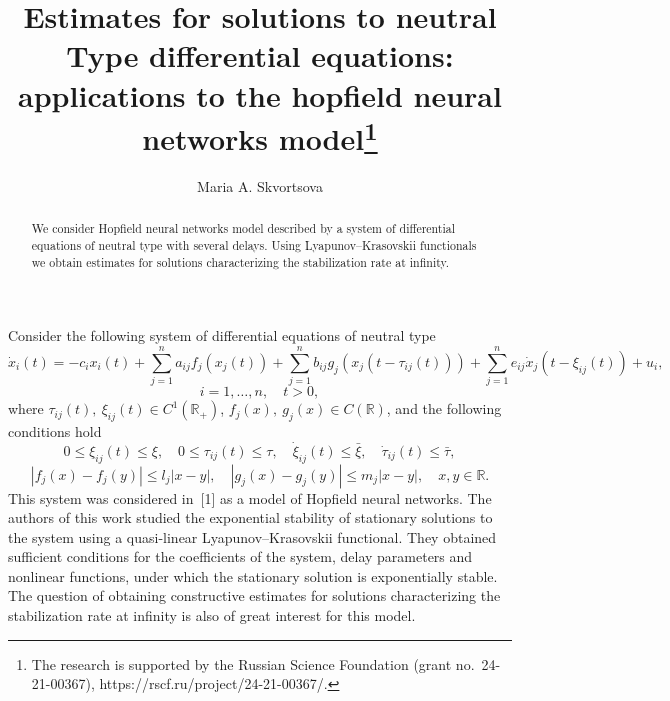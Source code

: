 \documentclass[12pt]{llncs}
\begin{document}
\fi

\title{Estimates for solutions to neutral Type differential equations: applications to the hopfield neural networks model\thanks{The research is supported
by the Russian Science Foundation (grant no.~24-21-00367),
https://rscf.ru/project/24-21-00367/.}}

\author{Maria A. Skvortsova}

\maketitle

\begin{abstract}
We consider Hopfield neural networks model described by a system of differential equations of neutral type with several delays.
Using Lyapunov--Krasovskii functionals we obtain estimates for solutions
characterizing the stabilization rate at infinity.

\end{abstract}

Consider the following system of differential equations of neutral type
$$
\dot{x}_i(t)=-c_i x_i(t)
+\sum\limits_{j=1}^{n} a_{ij} f_j(x_j(t))
+\sum\limits_{j=1}^{n} b_{ij} g_j(x_j(t-\tau_{ij}(t)))
+\sum\limits_{j=1}^{n} e_{ij} \dot{x}_j(t-\xi_{ij}(t))
+u_i,
$$
$$
i=1,\dots,n, \quad t>0,
$$
where
$\tau_{ij}(t), \ \xi_{ij}(t) \in C^1(\mathbb{R}_{+})$,
$f_j(x), \ g_j(x) \in C(\mathbb{R})$,
and the following conditions hold
$$
0 \leq \xi_{ij}(t) \leq \xi,
\quad
0 \leq \tau_{ij}(t) \leq \tau,
\quad
\dot{\xi}_{ij}(t) \leq \bar{\xi},
\quad
\dot{\tau}_{ij}(t) \leq \bar{\tau},
$$
$$
|f_j(x)-f_j(y)| \leq l_j |x-y|,
\quad
|g_j(x)-g_j(y)| \leq m_j |x-y|,
\quad
x,y \in \mathbb{R}.
$$
This system was considered in~[1] as a model of Hopfield neural networks.
The authors of this work studied the exponential stability of stationary solutions to the system using a quasi-linear Lyapunov--Krasovskii functional.
They obtained sufficient conditions for the coefficients of the system, delay parameters and nonlinear functions, under which the stationary solution is exponentially stable.
The question of obtaining constructive estimates for solutions characterizing the stabilization rate at infinity is also of great interest for this model.
\end{document}
